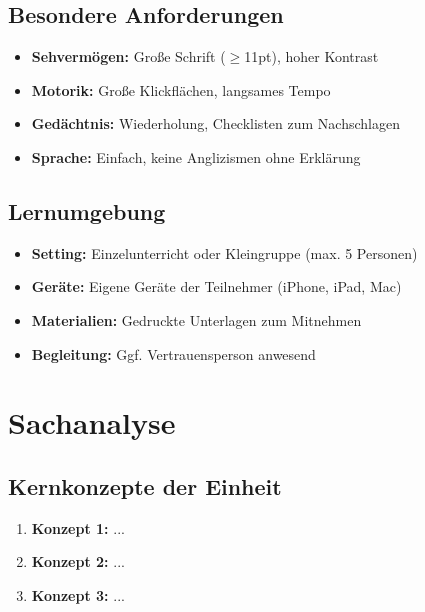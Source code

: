 \documentclass[11pt,a4paper]{article}
\begin{document}
\subsection{Besondere Anforderungen}
\begin{itemize}
    \item \textbf{Sehvermögen:} Große Schrift ($\geq$11pt), hoher Kontrast
    \item \textbf{Motorik:} Große Klickflächen, langsames Tempo
    \item \textbf{Gedächtnis:} Wiederholung, Checklisten zum Nachschlagen
    \item \textbf{Sprache:} Einfach, keine Anglizismen ohne Erklärung
\end{itemize}

\subsection{Lernumgebung}
\begin{itemize}
    \item \textbf{Setting:} Einzelunterricht oder Kleingruppe (max. 5 Personen)
    \item \textbf{Geräte:} Eigene Geräte der Teilnehmer (iPhone, iPad, Mac)
    \item \textbf{Materialien:} Gedruckte Unterlagen zum Mitnehmen
    \item \textbf{Begleitung:} Ggf. Vertrauensperson anwesend
\end{itemize}

\section{Sachanalyse}

\subsection{Kernkonzepte der Einheit}

\begin{enumerate}
    \item \textbf{Konzept 1:} ...
    \item \textbf{Konzept 2:} ...
    \item \textbf{Konzept 3:} ...
\end{enumerate}
\end{document}
